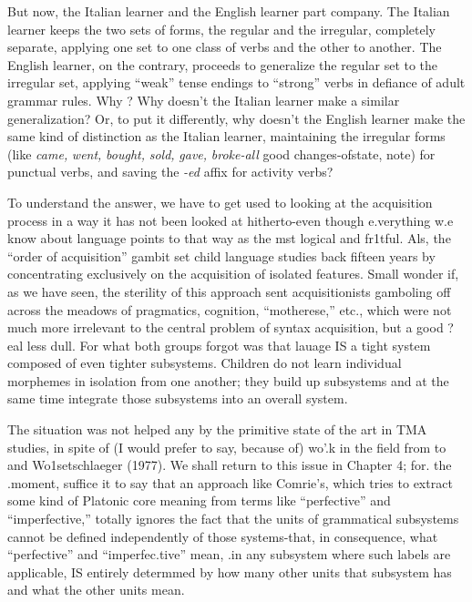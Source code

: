 But now, the Italian learner and the English learner part com\-pany. The Italian learner keeps the two sets of forms, the regular and the irregular, completely separate, applying one set to one class of verbs and the other to another. The English learner, on the contrary, proceeds to generalize the regular set to the irregular set, applying ``weak'' tense endings to ``strong'' verbs in defiance of adult grammar rules. Why ? Why doesn't the Italian learner make a similar generaliza\-tion? Or, to put it differently, why doesn't the English learner make the same kind of distinction as the Italian learner, maintaining the irregular forms (like \textit{came,} \textit{went,} \textit{bought,} \textit{sold,} \textit{gave,} \textit{broke-all} good changes-ofstate, note) for punctual verbs, and saving the \textit{{}-ed} affix for activity verbs?

To understand the answer, we have to get used to looking at the
acquisition process in a way it has not been looked at hitherto-even though e.verything w.e know about language points to that way as the mst logical and fr1tful. Als, the ``order of acquisition'' gambit set child language studies back fifteen years by concentrating exclusively on the acquisition of isolated features. Small wonder if, as we have seen, the sterility of this approach sent acquisitionists gamboling off across the meadows of pragmatics, cognition, ``motherese,'' etc., which were not much more irrelevant to the central problem of syntax acquisition, but a good ?eal less dull. For what both groups forgot was that lauage IS a tight system composed of even tighter sub\-systems. Children do not learn individual morphemes in isolation from
one another; they build up subsystems and at the same time integrate those subsystems into an overall system.

The situation was not helped any by the primitive state of the art in TMA studies, in spite of (I would prefer to say, because of) wo'.k in the field from \citet{Reichenbach1947} to \citet{Comrie1976} and Wo1setschlaeger (1977). We shall return to this issue in Chapter 4; for. the .moment, suffice it to say that an approach like Comrie's,
which tries to extract some kind of Platonic core meaning from terms like ``perfective'' and ``imperfective,'' totally ignores the fact that the units of grammatical subsystems cannot be defined independently of those systems-that, in consequence, what ``perfective'' and ``im\-perfec.tive'' mean, .in any subsystem where such labels are applicable,
IS entirely determmed by how many other units that subsystem has and what the other units mean.


